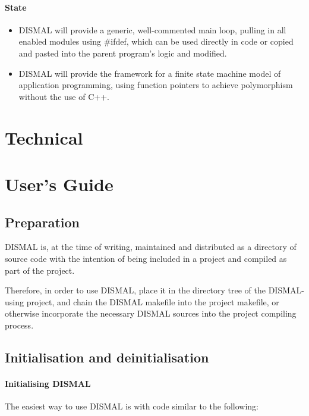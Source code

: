 \documentclass[a4paper]{scrbook}
\begin{document}
\subsection{State}

\begin{itemize}
  \item DISMAL will provide a generic, well-commented main loop,
    pulling in all enabled modules using \#ifdef, which can be used
    directly in code or copied and pasted into the parent program's
    logic and modified.
  \item DISMAL will provide the framework for a finite state machine
    model of application programming, using function pointers to
    achieve polymorphism without the use of C++.
\end{itemize}

\part{Technical}

\part{User's Guide}

\chapter{Preparation}

DISMAL is, at the time of writing, maintained and distributed as a
directory of source code with the intention of being included in a
project and compiled as part of the project.

Therefore, in order to use DISMAL, place it in the directory tree of
the DISMAL-using project, and chain the DISMAL makefile into the
project makefile, or otherwise incorporate the necessary DISMAL
sources into the project compiling process.

\chapter{Initialisation and deinitialisation}

\subsection{Initialising DISMAL}

The easiest way to use DISMAL is with code similar to the following:
\end{document}
